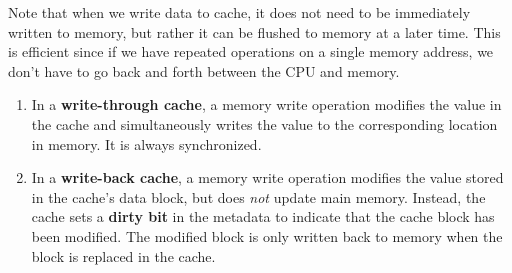   \begin{definition}
    Note that when we write data to cache, it does not need to be immediately written to memory, but rather it can be flushed to memory at a later time. This is efficient since if we have repeated operations on a single memory address, we don't have to go back and forth between the CPU and memory. 
    \begin{enumerate}
      \item In a \textbf{write-through cache}, a memory write operation modifies the value in the cache and simultaneously writes the value to the corresponding location in memory. It is always synchronized. 
      \item In a \textbf{write-back cache}, a memory write operation modifies the value stored in the cache's data block, but does \textit{not} update main memory. Instead, the cache sets a \textbf{dirty bit} in the metadata to indicate that the cache block has been modified. The modified block is only written back to memory when the block is replaced in the cache. 

      \begin{figure}[H]
        \centering 
\end{figure}
\end{enumerate}
\end{definition}
